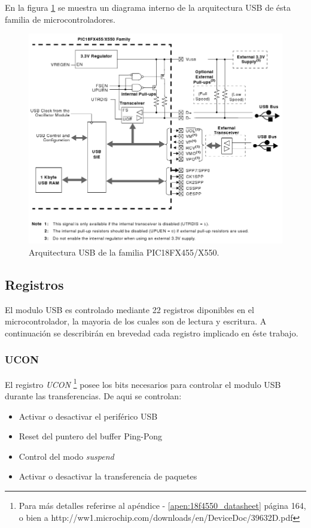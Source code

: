 En la figura \ref{fig:pic_usb_internal} se muestra un diagrama interno de
la arquitectura USB de \'esta familia de microcontroladores.

\begin{figure}
\centering
\includegraphics[scale=0.5]{./img/pic_usb_internal.png}
\caption{Arquitectura USB de la familia PIC18FX455/X550.}
\label{fig:pic_usb_internal}
\end{figure}


\subsection{Registros}
El modulo USB es controlado mediante 22 registros diponibles en el
microcontrolador, la mayoria de los cuales son de lectura y escritura.
A continuaci\'on se describir\'an en brevedad cada registro implicado en
\'este trabajo.

\subsubsection{UCON}
El registro \emph{UCON} \footnote{Para m\'as detalles referirse al
ap\'endice - \ref{apen:18f4550_datasheet} p\'agina 164, o bien a
http://ww1.microchip.com/downloads/en/DeviceDoc/39632D.pdf}
posee los bits necesarios para controlar el modulo USB
durante las transferencias. De aqui se controlan:

\begin{itemize}
 \item Activar o desactivar el perif\'erico USB

 \item Reset del puntero del buffer Ping-Pong  

 \item Control del modo \emph{suspend}

 \item Activar o desactivar la transferencia de paquetes
\end{itemize}

